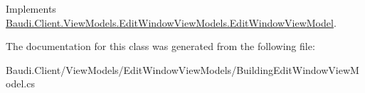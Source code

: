 Implements \hyperlink{class_baudi_1_1_client_1_1_view_models_1_1_edit_window_view_models_1_1_edit_window_view_model_aeae328bfe7608e01ce3c54da0c13f781}{Baudi.\+Client.\+View\+Models.\+Edit\+Window\+View\+Models.\+Edit\+Window\+View\+Model}.



The documentation for this class was generated from the following file\+:\begin{DoxyCompactItemize}
\item 
Baudi.\+Client/\+View\+Models/\+Edit\+Window\+View\+Models/Building\+Edit\+Window\+View\+Model.\+cs\end{DoxyCompactItemize}
